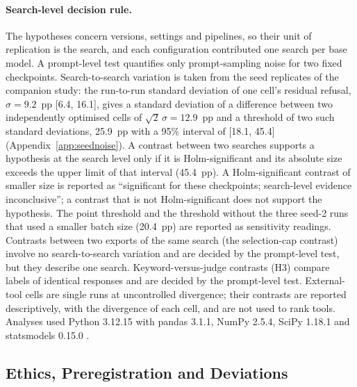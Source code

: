 \paragraph{Search-level decision rule.} The hypotheses concern versions, settings and pipelines, so their unit of
replication is the search, and each configuration contributed one search per base model. A prompt-level test
quantifies only prompt-sampling noise for two fixed checkpoints. Search-to-search variation is taken from the seed
replicates of the companion study: the run-to-run standard deviation of one cell's residual refusal, $\sigma = 9.2$~pp
[6.4, 16.1], gives a standard deviation of a difference between two independently optimised cells of
$\sqrt{2}\,\sigma = 12.9$~pp and a threshold of two such standard deviations, 25.9~pp with a 95\% interval of
[18.1, 45.4] (Appendix~\ref{app:seednoise}). A contrast between two searches supports a hypothesis at the search
level only if it is Holm-significant and its absolute size exceeds the upper limit of that interval (45.4~pp). A
Holm-significant contrast of smaller size is reported as ``significant for these checkpoints; search-level evidence
inconclusive''; a contrast that is not Holm-significant does not support the hypothesis. The point threshold and the
threshold without the three seed-2 runs that used a smaller batch size (20.4~pp) are reported as sensitivity
readings. Contrasts between two exports of the same search (the selection-cap contrast) involve no search-to-search
variation and are decided by the prompt-level test, but they describe one search. Keyword-versus-judge contrasts (H3)
compare labels of identical responses and are decided by the prompt-level test. External-tool cells are single runs at
uncontrolled divergence; their contrasts are reported descriptively, with the divergence of each cell, and are not
used to rank tools. Analyses used Python 3.12.15 with pandas
3.1.1, NumPy 2.5.4, SciPy 1.18.1 and statsmodels 0.15.0 \cite{seabold2010statsmodels}.

\subsection{Ethics, Preregistration and Deviations}
\label{sec:deviations}


